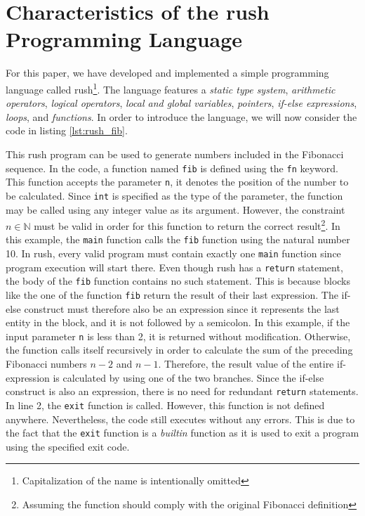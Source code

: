 \newpage
\section{Characteristics of the rush Programming Language}

For this paper, we have developed and implemented a simple programming language called rush\footnote{Capitalization of the name is intentionally omitted}.
The language features a \emph{static type system}, \emph{arithmetic operators}, \emph{logical operators}, \emph{local and global variables}, \emph{pointers}, \emph{if-else expressions}, \emph{loops}, and \emph{functions}.
In order to introduce the language, we will now consider the code in listing \ref{lst:rush_fib}.


This rush program can be used to generate numbers included in the Fibonacci sequence.
In the code, a function named \texttt{fib} is defined using the \texttt{fn} keyword.
This function accepts the parameter \texttt{n}, it denotes the position of the number to be calculated.
Since \texttt{int} is specified as the type of the parameter, the function may be called using any integer value as its argument.
However, the constraint $n \in \mathbb{N}$ must be valid in order for this function to return the correct result\footnote{Assuming the function should comply with the original Fibonacci definition}.
In this example, the \texttt{main} function calls the \texttt{fib} function using the natural number 10.
In rush, every valid program must contain exactly one \texttt{main} function since program execution will start there.
Even though rush has a \texttt{return} statement, the body of the \texttt{fib} function contains no such statement.
This is because blocks like the one of the function \texttt{fib} return the result of their last expression.
The if-else construct must therefore also be an expression since it represents the last entity in the block, and it is not followed by a semicolon.
In this example, if the input parameter \texttt{n} is less than 2, it is returned without modification.
Otherwise, the function calls itself recursively in order to calculate the sum of the preceding Fibonacci numbers $n - 2$ and $n - 1$.
Therefore, the result value of the entire if-expression is calculated by using one of the two branches.
Since the if-else construct is also an expression, there is no need for redundant \texttt{return} statements.
In line 2, the \texttt{exit} function is called.
However, this function is not defined anywhere.
Nevertheless, the code still executes without any errors.
This is due to the fact that the \texttt{exit} function is a \emph{builtin} function as it is used to exit a program using the specified exit code.

